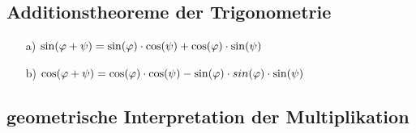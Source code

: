 \subsection{Additionstheoreme der Trigonometrie}
\begin{enumerate}
\item[a)]$\sin(\varphi + \psi) = \sin(\varphi) \cdot \cos(\psi) + \cos(\varphi) \cdot \sin(\psi)$\\
\item[b)]$\cos(\varphi + \psi) = \cos(\varphi) \cdot \cos(\psi) - \sin(\varphi) \cdot sin(\varphi) \cdot \sin(\psi)$
\end{enumerate}
\subsection{geometrische Interpretation der Multiplikation}
